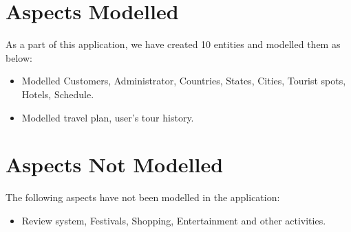\documentclass[11pt]{article}
\begin{document}
\section{Aspects Modelled}
As a part of this application, we have created 10 entities and modelled them as below:
\begin{itemize}
\item Modelled Customers, Administrator, Countries, States, Cities, Tourist spots, Hotels, Schedule.
\item Modelled travel plan, user's tour history. 
\end{itemize}

\section{Aspects Not Modelled}
The following aspects have not been modelled in the application:
\begin{itemize}
\item Review system, Festivals, Shopping, Entertainment and other activities.
\end{itemize}
\end{document}
